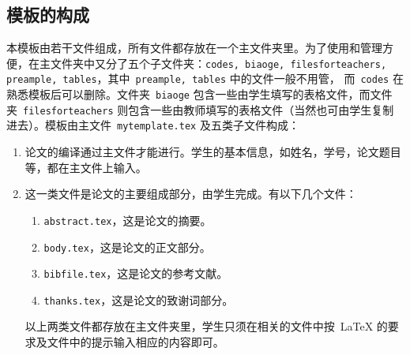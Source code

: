 \subsection{模板的构成}\label{subsec:1}
本模板由若干文件组成，所有文件都存放在一个主文件夹里。为了使用和管理方便，在主文件夹中又分了五个子文件夹：{\tt codes, biaoge, filesforteachers, preample, tables}，其中~{\tt preample, tables} 中的文件一般不用管，
而~{\tt codes} 在熟悉模板后可以删除。文件夹~{\tt biaoge} 包含一些由学生填写的表格文件，而文件夹~{\tt filesforteachers} 则包含一些由教师填写的表格文件（当然也可由学生复制进去）。模板由主文件~{\tt mytemplate.tex} 及五类子文件构成：
\begin{enumerate}
  \item 论文的编译通过主文件才能进行。学生的基本信息，如姓名，学号，论文题目等，都在主文件上输入。
  \item\label{item:2} 这一类文件是论文的主要组成部分，由学生完成。有以下几个文件：
  \begin{enumerate}
    \item {\tt abstract.tex}，这是论文的摘要。
    \item {\tt body.tex}，这是论文的正文部分。
    \item {\tt bibfile.tex}，这是论文的参考文献。
    \item {\tt thanks.tex}，这是论文的致谢词部分。
  \end{enumerate}
  以上两类文件都存放在主文件夹里，学生只须在相关的文件中按~\LaTeX\index{\LaTeX} 的要求及文件中的提示输入相应的内容即可。

\end{enumerate}
